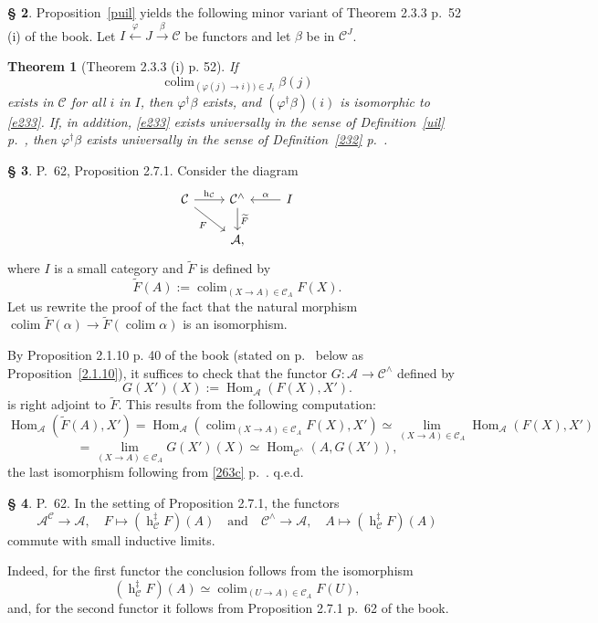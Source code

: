 \documentclass[12pt]{article}
\newtheorem{thm}{Theorem}
\theoremstyle{remark}
\theoremstyle{definition}
\newtheorem{s}[thm]{\S}
\newcommand{\oo}{\operatorname}
\newcommand{\A}{\mathcal A}
\newcommand{\C}{\mathcal C}
\newcommand{\pp}{\varphi}
\newcommand{\xr}{\xrightarrow}
\DeclareMathOperator*{\colim}{colim}
\DeclareMathOperator{\hy}{h}
\DeclareMathOperator{\Hom}{Hom}
\begin{document}
\begin{s} 
Proposition~\ref{puil} yields the following minor variant of Theorem 2.3.3 p.~52 (i) of the book. Let $I\xleftarrow\pp J\xr\beta\C$ be functors and let $\beta$ be in $\C^J$. 

\begin{thm}[Theorem 2.3.3 (i) p. 52]\label{233}
If 
%
\begin{equation}\label{e233}
\colim_{(\pp(j)\to i))\in J_i}\beta(j)
\end{equation}
%
exists in $\C$ for all $i$ in $I$, then $\pp^\dagger\beta$ exists, and $(\pp^\dagger\beta)(i)$ is isomorphic to \eqref{e233}. If, in addition, \eqref{e233} exists universally in the sense of Definition~\ref{uil} p.~\pageref{uil}, then $\pp^\dagger\beta$ exists universally in the sense of Definition~\ref{232} p.~\pageref{232}. 
\end{thm}
\end{s}

%

\begin{s}\label{c271b}
P.~62, Proposition 2.7.1. Consider the diagram 
$$
\begin{tikzcd}
\C\ar{r}{\hy_\C}\ar{dr}[swap]{F}&\C^\wedge\ar{d}{\widetilde F}&I\ar{l}[swap]{\alpha}\\
&\A,
\end{tikzcd}
$$
where $I$ is a small category and $\widetilde F$ is defined by 
$$
\widetilde F(A):=\colim_{(X\to A)\in\C_A}F(X). 
$$
Let us rewrite the proof of the fact that the natural morphism $\colim\widetilde F(\alpha)\to\widetilde F\left(\colim\alpha\right)$ is an isomorphism. 

By Proposition 2.1.10 p. 40 of the book (stated on p.~\pageref{2.1.10} below as Proposition~\ref{2.1.10}), it suffices to check that the functor $G:\A\to\C^\wedge$ defined by 
$$
G(X')(X):=\Hom_{\A}(F(X),X').
$$ 
is right adjoint to $\widetilde F$. This results from the following computation: 
$$
\Hom_{\A}\left(\widetilde F(A),X'\right)=
\Hom_{\A}\left(\colim_{(X\to A)\in\C_A}F(X),X'\right)\simeq 
\lim_{(X\to A)\in\C_A}\Hom_{\A}(F(X),X')
$$
$$
=\lim_{(X\to A)\in\C_A}G(X')(X)\simeq\Hom_{\C^\wedge}(A,G(X')), 
$$ 
the last isomorphism following from \eqref{263c} p.~\pageref{263c}. q.e.d.
\end{s}

%

\begin{s}\label{bil}
P.~62. In the setting of Proposition 2.7.1, the functors
$$
\A^\C\to\A,\quad F\mapsto(\oo h_\C^\ddagger F)(A)\quad\text{and}\quad
\C^\wedge\to\A,\quad A\mapsto(\oo h_\C^\ddagger F)(A)
$$ 
commute with small inductive limits. 

Indeed, for the first functor the conclusion follows from the isomorphism 
$$
(\oo h_\C^\ddagger F)(A)\simeq\colim_{(U\to A)\in\C_A}F(U),
$$ 
and, for the second functor it follows from Proposition 2.7.1 p.~62 of the book.
\end{s}
\end{document}

